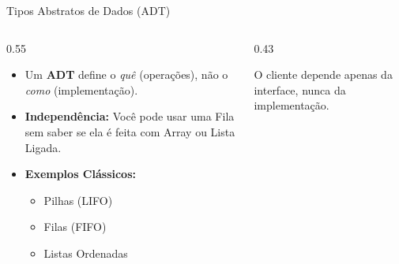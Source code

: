 \documentclass[aspectratio=169]{beamer}
\begin{document}
\begin{frame}{Tipos Abstratos de Dados (ADT)}
    \begin{columns}[T]
        \begin{column}{0.55\textwidth}
            \begin{itemize}
                \item Um \textbf{ADT} define o \textit{quê} (operações), não o \textit{como} (implementação).
                \item \textbf{Independência:} Você pode usar uma Fila sem saber se ela é feita com Array ou Lista Ligada.
                \item \textbf{Exemplos Clássicos:}
                    \begin{itemize}
                        \item Pilhas (LIFO)
                        \item Filas (FIFO)
                        \item Listas Ordenadas
                    \end{itemize}
            \end{itemize}
        \end{column}
        \begin{column}{0.43\textwidth}
            \centering
            \vspace{0.3cm}
            {\scriptsize O cliente depende apenas da interface, nunca da implementação.}
        \end{column}
    \end{columns}
\end{frame}
\end{document}
